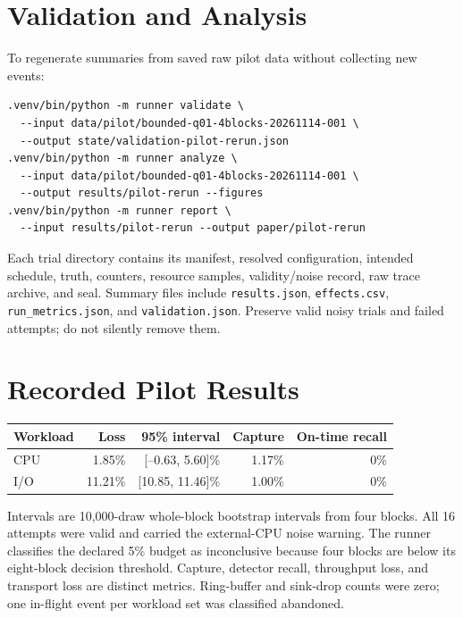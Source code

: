 \documentclass[10pt]{article}
\begin{document}
\section{Validation and Analysis}
To regenerate summaries from saved raw pilot data without collecting new events:
\begin{lstlisting}
.venv/bin/python -m runner validate \
  --input data/pilot/bounded-q01-4blocks-20261114-001 \
  --output state/validation-pilot-rerun.json
.venv/bin/python -m runner analyze \
  --input data/pilot/bounded-q01-4blocks-20261114-001 \
  --output results/pilot-rerun --figures
.venv/bin/python -m runner report \
  --input results/pilot-rerun --output paper/pilot-rerun
\end{lstlisting}
Each trial directory contains its manifest, resolved configuration, intended schedule, truth, counters, resource samples, validity/noise record, raw trace archive, and seal. Summary files include \texttt{results.json}, \texttt{effects.csv}, \texttt{run\_metrics.json}, and \texttt{validation.json}. Preserve valid noisy trials and failed attempts; do not silently remove them.

\section{Recorded Pilot Results}
\begin{tabular}{@{}lrrrr@{}}
\toprule
Workload & Loss & 95\% interval & Capture & On-time recall\\
\midrule
CPU & 1.85\% & [--0.63, 5.60]\% & 1.17\% & 0\%\\
I/O & 11.21\% & [10.85, 11.46]\% & 1.00\% & 0\%\\
\bottomrule
\end{tabular}

Intervals are 10,000-draw whole-block bootstrap intervals from four blocks. All 16 attempts were valid and carried the external-CPU noise warning. The runner classifies the declared 5\% budget as inconclusive because four blocks are below its eight-block decision threshold. Capture, detector recall, throughput loss, and transport loss are distinct metrics. Ring-buffer and sink-drop counts were zero; one in-flight event per workload set was classified abandoned.
\end{document}
